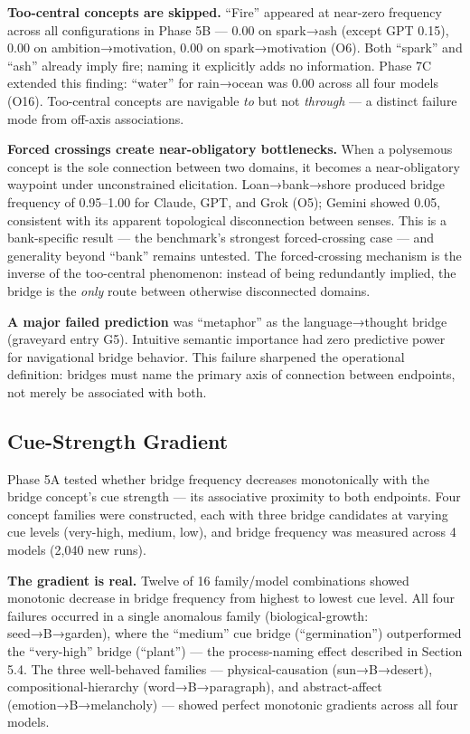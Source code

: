 \textbf{Too-central concepts are skipped.} ``Fire'' appeared at near-zero frequency across all configurations in Phase 5B --- 0.00 on spark→ash (except GPT 0.15), 0.00 on ambition→motivation, 0.00 on spark→motivation (O6). Both ``spark'' and ``ash'' already imply fire; naming it explicitly adds no information. Phase 7C extended this finding: ``water'' for rain→ocean was 0.00 across all four models (O16). Too-central concepts are navigable \emph{to} but not \emph{through} --- a distinct failure mode from off-axis associations.

\textbf{Forced crossings create near-obligatory bottlenecks.} When a polysemous concept is the sole connection between two domains, it becomes a near-obligatory waypoint under unconstrained elicitation. Loan→bank→shore produced bridge frequency of 0.95--1.00 for Claude, GPT, and Grok (O5); Gemini showed 0.05, consistent with its apparent topological disconnection between senses. This is a bank-specific result --- the benchmark's strongest forced-crossing case --- and generality beyond ``bank'' remains untested. The forced-crossing mechanism is the inverse of the too-central phenomenon: instead of being redundantly implied, the bridge is the \emph{only} route between otherwise disconnected domains.

\textbf{A major failed prediction} was ``metaphor'' as the language→thought bridge (graveyard entry G5). Intuitive semantic importance had zero predictive power for navigational bridge behavior. This failure sharpened the operational definition: bridges must name the primary axis of connection between endpoints, not merely be associated with both.

\subsection{Cue-Strength Gradient}\label{cue-strength-gradient}

Phase 5A tested whether bridge frequency decreases monotonically with the bridge concept's cue strength --- its associative proximity to both endpoints. Four concept families were constructed, each with three bridge candidates at varying cue levels (very-high, medium, low), and bridge frequency was measured across 4 models (2,040 new runs).

\textbf{The gradient is real.} Twelve of 16 family/model combinations showed monotonic decrease in bridge frequency from highest to lowest cue level. All four failures occurred in a single anomalous family (biological-growth: seed→B→garden), where the ``medium'' cue bridge (``germination'') outperformed the ``very-high'' bridge (``plant'') --- the process-naming effect described in Section 5.4. The three well-behaved families --- physical-causation (sun→B→desert), compositional-hierarchy (word→B→paragraph), and abstract-affect (emotion→B→melancholy) --- showed perfect monotonic gradients across all four models.

